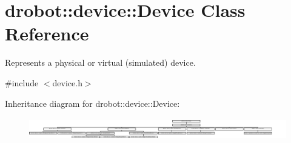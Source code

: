 \hypertarget{classdrobot_1_1device_1_1Device}{\section{drobot\-:\-:device\-:\-:Device Class Reference}
\label{classdrobot_1_1device_1_1Device}
}


Represents a physical or virtual (simulated) device.  




{\ttfamily \#include $<$device.\-h$>$}

Inheritance diagram for drobot\-:\-:device\-:\-:Device\-:\begin{figure}[H]
\begin{center}
\leavevmode
\includegraphics[height=0.981423cm]{classdrobot_1_1device_1_1Device}
\end{center}
\end{figure}
